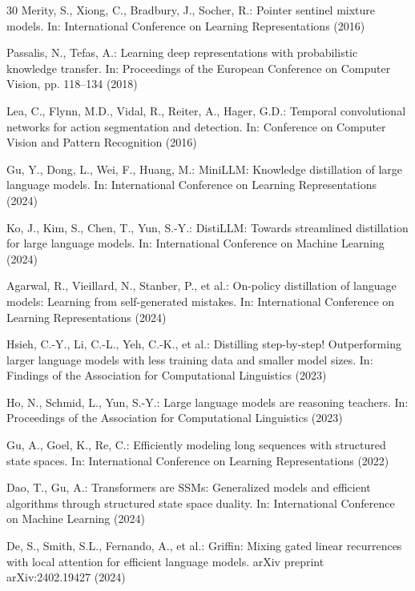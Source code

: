 \documentclass[conference]{IEEEtran}
\begin{document}
\begin{thebibliography}{30}
Merity, S., Xiong, C., Bradbury, J., Socher, R.: Pointer sentinel
mixture models. In: International Conference on Learning Representations (2016)

Passalis, N., Tefas, A.: Learning deep representations with probabilistic
knowledge transfer. In: Proceedings of the European Conference on Computer
Vision, pp. 118--134 (2018)

Lea, C., Flynn, M.D., Vidal, R., Reiter, A., Hager, G.D.: Temporal
convolutional networks for action segmentation and detection.
In: Conference on Computer Vision and Pattern Recognition (2016)

Gu, Y., Dong, L., Wei, F., Huang, M.: MiniLLM: Knowledge distillation of
large language models. In: International Conference on Learning
Representations (2024)

Ko, J., Kim, S., Chen, T., Yun, S.-Y.: DistiLLM: Towards streamlined
distillation for large language models. In: International Conference on
Machine Learning (2024)

Agarwal, R., Vieillard, N., Stanber, P., et al.: On-policy distillation of
language models: Learning from self-generated mistakes.
In: International Conference on Learning Representations (2024)

Hsieh, C.-Y., Li, C.-L., Yeh, C.-K., et al.: Distilling step-by-step!
Outperforming larger language models with less training data and smaller
model sizes. In: Findings of the Association for Computational
Linguistics (2023)

Ho, N., Schmid, L., Yun, S.-Y.: Large language models are reasoning
teachers. In: Proceedings of the Association for Computational
Linguistics (2023)

Gu, A., Goel, K., Re, C.: Efficiently modeling long sequences with
structured state spaces. In: International Conference on Learning
Representations (2022)

Dao, T., Gu, A.: Transformers are SSMs: Generalized models and efficient
algorithms through structured state space duality.
In: International Conference on Machine Learning (2024)

De, S., Smith, S.L., Fernando, A., et al.: Griffin: Mixing gated linear
recurrences with local attention for efficient language models.
arXiv preprint arXiv:2402.19427 (2024)


\end{thebibliography}
\end{document}
